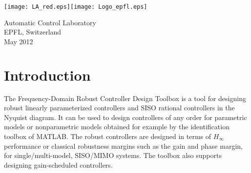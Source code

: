 \documentclass [12pt , a4paper] {report}
\begin{document}


\begin{titlepage}

\vspace{1cm}


\vspace*{0.5cm}

\vspace{6cm}



\vspace{2cm}


\begin{center}

\texttt{[image: LA\_red.eps]}\hspace{5cm}\texttt{[image: Logo\_epfl.eps]}

\vspace*{0.5cm}

{Automatic Control Laboratory\\
EPFL, Switzerland\\
May 2012}
\end{center}
\end{titlepage}


\tableofcontents

\chapter{Introduction}
The Frequency-Domain Robust Controller Design Toolbox is a tool for designing robust linearly parameterized controllers and SISO rational controllers in the Nyquist diagram. It can be used to design controllers of any order for parametric models or nonparametric models obtained for example by the identification toolbox of MATLAB. The robust controllers are designed in terms of $H_\infty$ performance or classical robustness margins such as the gain and phase margin, for single/multi-model, SISO/MIMO systems.  The toolbox also supports designing gain-scheduled controllers. 
\end{document}

